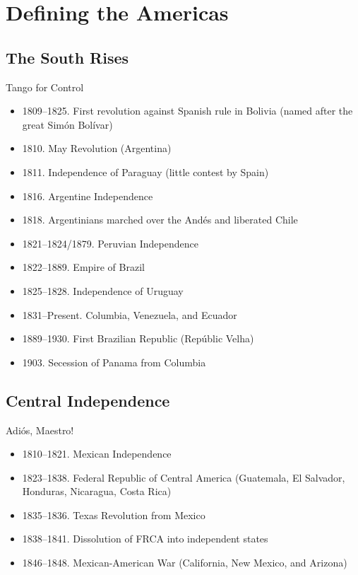 \section{Defining the Americas}
\subsection{The South Rises}
\begin{frame}{Tango for Control}
	\begin{itemize}
		\item<1-11>1809--1825. First revolution against Spanish rule in Bolivia (named after the great Sim{\'o}n Bol{\'i}var)
		\item<2-11>1810. May Revolution (Argentina)
		\item<3-11>1811. Independence of Paraguay (little contest by Spain)
		\item<4-11>1816. Argentine Independence
		\item<5-11>1818. Argentinians marched over the And{\'e}s and liberated Chile
		\item<6-11>1821--1824/1879. Peruvian Independence
		\item<7-11>1822--1889. Empire of Brazil
		\item<8-11>1825--1828. Independence of Uruguay
		\item<9-11>1831--Present. Columbia, Venezuela, and Ecuador
		\item<10-11>1889--1930. First Brazilian Republic (Rep{\'u}blic Velha)
		\item<11>1903. Secession of Panama from Columbia
	\end{itemize}
\end{frame}

\subsection{Central Independence}
\begin{frame}{Adi{\'o}s, Maestro!}
	\begin{itemize}
		\item<1-5>1810--1821. Mexican Independence
		\item<2-5>1823--1838. Federal Republic of Central America (Guatemala, El Salvador, Honduras, Nicaragua, Costa Rica)
		\item<3-5>1835--1836. Texas Revolution from Mexico
		\item<4-5>1838--1841. Dissolution of FRCA into independent states
		\item<5>1846--1848. Mexican-American War (California, New Mexico, and Arizona)
	\end{itemize}
\end{frame}


